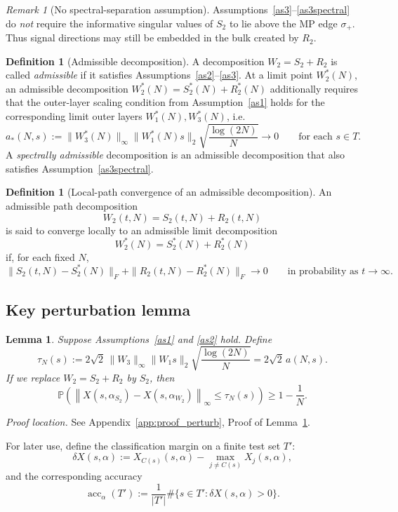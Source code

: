 \documentclass[11pt]{article}
\theoremstyle{plain}
\newtheorem{lem}[thm]{Lemma}
\theoremstyle{definition}
\newtheorem{defn}[thm]{Definition}
\theoremstyle{remark}
\newtheorem{rem}[thm]{Remark}
\newcommand{\PP}{\mathbb{P}}
\newcommand{\acc}{\operatorname{acc}}
\newcommand{\1}{\mathbf{1}}
\newcommand{\proofloc}[1]{\par\noindent\emph{Proof location.} #1\par}
\begin{document}
\begin{rem}[No spectral-separation assumption]
Assumptions~\ref{as3}--\ref{as3spectral} do \emph{not} require the informative singular values of \(S_2\) to lie above the MP edge \(\sigma_+\). Thus signal directions may still be embedded in the bulk created by \(R_2\).
\end{rem}

\begin{defn}[Admissible decomposition]
\label{def:admissible_decomposition}
A decomposition \(W_2=S_2+R_2\) is called \emph{admissible} if it satisfies Assumptions~\ref{as2}--\ref{as3}. At a limit point \(W_2^*(N)\), an admissible decomposition \(W_2^*(N)=S_2^*(N)+R_2^*(N)\) additionally requires that the outer-layer scaling condition from Assumption~\ref{as1} holds for the corresponding limit outer layers \(W_1^*(N),W_3^*(N)\), i.e.
\[
a_*(N,s):=\|W_3^*(N)\|_\infty\|W_1^*(N)s\|_2\sqrt{\frac{\log(2N)}{N}}\to0
\qquad \text{for each } s\in T.
\]
A \emph{spectrally admissible} decomposition is an admissible decomposition that also satisfies Assumption~\ref{as3spectral}.
\end{defn}

\begin{defn}[Local-path convergence of an admissible decomposition]
\label{def:local_path_convergence}
An admissible path decomposition
\[
W_2(t,N)=S_2(t,N)+R_2(t,N)
\]
is said to converge locally to an admissible limit decomposition
\[
W_2^*(N)=S_2^*(N)+R_2^*(N)
\]
if, for each fixed \(N\),
\[
\|S_2(t,N)-S_2^*(N)\|_F+\|R_2(t,N)-R_2^*(N)\|_F\to0
\qquad\text{in probability as }t\to\infty.
\]
\end{defn}

\subsection{Key perturbation lemma}
\label{subsec:key_perturbation_lemma}

\begin{lem}
\label{lem:remove_R}
Suppose Assumptions~\ref{as1} and \ref{as2} hold. Define
\[
\tau_N(s):=
2\sqrt{2}\,\|W_3\|_\infty \|W_1s\|_2\sqrt{\frac{\log(2N)}{N}}
=2\sqrt{2}\,a(N,s).
\]
If we replace \(W_2=S_2+R_2\) by \(S_2\), then
\[
\PP\!\left(
\left\|X(s,\alpha_{S_2})-X(s,\alpha_{W_2})\right\|_\infty
\le \tau_N(s)
\right)
\ge 1-\frac{1}{N}.
\]
\end{lem}
\proofloc{See Appendix~\ref{app:proof_perturb}, Proof of Lemma~\ref{lem:remove_R}.}

For later use, define the classification margin on a finite test set \(T'\):
\[
\delta X(s,\alpha):=
X_{C(s)}(s,\alpha)-\max_{j\neq C(s)}X_j(s,\alpha),
\]
and the corresponding accuracy
\[
\acc_\alpha(T'):=\frac1{|T'|}\#\{s\in T':\delta X(s,\alpha)>0\}.
\]
\end{document}

